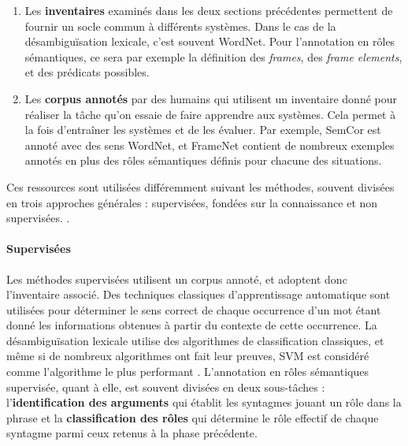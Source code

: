 \begin{enumerate}

    \item Les \textbf{inventaires} examinés dans les deux sections précédentes
        permettent de fournir un socle commun à différents systèmes. Dans le
        cas de la désambiguïsation lexicale, c'est souvent WordNet. Pour
        l'annotation en rôles sémantiques, ce sera par exemple la définition
        des \textit{frames}, des \textit{frame elements}, et des prédicats
        possibles.

    \item Les \textbf{corpus annotés} par des humains qui utilisent un
        inventaire donné pour réaliser la tâche qu'on essaie de faire apprendre
        aux systèmes. Cela permet à la fois d'entraîner les systèmes et de les
        évaluer. Par exemple, SemCor est annoté avec des sens WordNet, et
        FrameNet contient de nombreux exemples annotés en plus des rôles
        sémantiques définis pour chacune des situations.

\end{enumerate}

Ces ressources sont utilisées différemment suivant les méthodes, souvent
divisées en trois approches générales : supervisées, fondées sur la
connaissance et non supervisées. \citep{navigli2009word}.

\paragraph{Supervisées}

Les méthodes supervisées utilisent un corpus annoté, et adoptent donc
l'inventaire associé. Des techniques classiques d'apprentissage automatique
sont utilisées pour déterminer le sens correct de chaque occurrence d'un mot
étant donné les informations obtenues à partir du contexte de cette occurrence.
La désambiguïsation lexicale utilise des algorithmes de classification
classiques, et même si de nombreux algorithmes ont fait leur preuves, SVM est
considéré comme l'algorithme le plus performant \cite{navigli2012quick}.
L'annotation en rôles sémantiques supervisée, quant à elle, est souvent
divisées en deux sous-tâches : l'\textbf{identification des arguments} qui
établit les syntagmes jouant un rôle dans la phrase et la
\textbf{classification des rôles} qui détermine le rôle effectif de chaque
syntagme parmi ceux retenus à la phase précédente.

